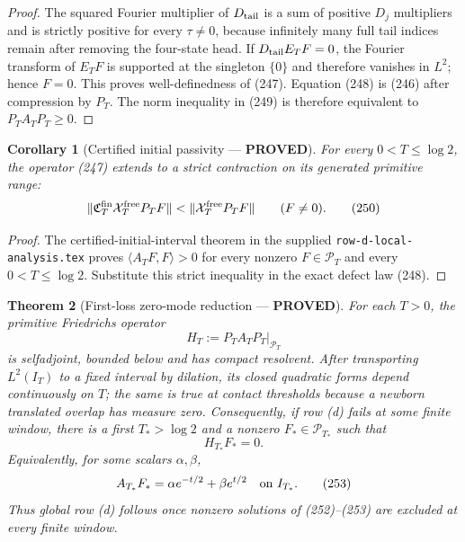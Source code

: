 \documentclass[11pt]{article}
\newtheorem{theorem}{Theorem}
\newtheorem{corollary}[theorem]{Corollary}
\newcommand{\PROVED}{\textcolor{green!45!black}{\textbf{PROVED}}}
\begin{document}
\begin{proof}
The squared Fourier multiplier of $D_{\rm tail}$ is a sum of positive
$D_j$ multipliers and is strictly positive for every $\tau\ne0$, because
infinitely many full tail indices remain after removing the four-state head.
If $D_{\rm tail}E_TF=0$, the Fourier transform of $E_TF$ is supported at the
singleton $\{0\}$ and therefore vanishes in $L^2$; hence $F=0$.  This proves
well-definedness of (247).  Equation (248) is (246) after compression by
$P_T$.  The norm inequality in (249) is therefore equivalent to
$P_TA_TP_T\ge0$.
\end{proof}

\begin{corollary}[Certified initial passivity --- \PROVED]
For every $0<T\le\log2$, the operator (247) extends to a strict contraction
on its generated primitive range:
\begin{equation}
 \|\mathfrak C_T^{\rm fin}
       \mathcal X_T^{\rm free}P_TF\|
 <\|\mathcal X_T^{\rm free}P_TF\|\qquad(F\ne0).     \tag{250}
\end{equation}
\end{corollary}

\begin{proof}
The certified-initial-interval theorem in the supplied
\texttt{row-d-local-analysis.tex} proves
$\langle A_TF,F\rangle>0$ for every nonzero $F\in\mathcal P_T$ and every
$0<T\le\log2$.  Substitute this strict inequality in the exact defect law
(248).
\end{proof}

\begin{theorem}[First-loss zero-mode reduction --- \PROVED]
For each $T>0$, the primitive Friedrichs operator
\begin{equation}
 H_T:=P_TA_TP_T\big|_{\mathcal P_T}                  \tag{251}
\end{equation}
is selfadjoint, bounded below and has compact resolvent.  After transporting
$L^2(I_T)$ to a fixed interval by dilation, its closed quadratic forms depend
continuously on $T$; the same is true at contact thresholds because a newborn
translated overlap has measure zero.  Consequently, if row (d) fails at some
finite window, there is a first $T_*>\log2$ and a nonzero
$F_*\in\mathcal P_{T_*}$ such that
\begin{equation}
 H_{T_*}F_*=0.                                        \tag{252}
\end{equation}
Equivalently, for some scalars $\alpha,\beta$,
\begin{equation}
 A_{T_*}F_*
 =\alpha e^{-t/2}+\beta e^{t/2}\quad\hbox{on }I_{T_*}. \tag{253}
\end{equation}
Thus global row (d) follows once nonzero solutions of (252)--(253) are
excluded at every finite window.
\end{theorem}
\end{document}
